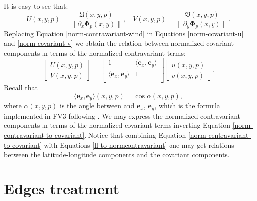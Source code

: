 It is easy to see that:
\begin{equation}
	{U}(x,y,p)  = \frac{\mathfrak{U}(x,y,p)}{\|\partial_x\boldsymbol{\Phi}_p(x,y)\|}, \quad
	{V}(x,y,p)  = \frac{\mathfrak{V}(x,y,p)}{\|\partial_y\boldsymbol{\Phi}_p(x,y)\|}.
\end{equation}
Replacing Equation \eqref{norm-contravariant-wind} in 
Equations \eqref{norm-covariant-u} and \eqref{norm-covariant-v} we obtain
the relation between normalized covariant components in terms of the
normalized contravariant terms:
\begin{equation}
	\label{norm-contravariant-to-covariant}
	\begin{bmatrix}
		{U}(x,y,p) \\
		{V}(x,y,p)
	\end{bmatrix}
	=
	\begin{bmatrix}
		1 
		& \langle 	\boldsymbol{e}_x, \boldsymbol{e}_y \rangle \\
		\langle 	\boldsymbol{e}_x, \boldsymbol{e}_y \rangle 
		& 1\\
	\end{bmatrix}
	\begin{bmatrix}
		{u} (x,y,p) \\
		{v} (x,y,p) 
	\end{bmatrix}.
\end{equation}
Recall that
\begin{equation}
\langle 	\boldsymbol{e}_x, \boldsymbol{e}_y \rangle(x,y,p) = \cos \alpha(x,y,p),
\end{equation}
where $\alpha(x,y,p)$ is the angle between and 	$\boldsymbol{e}_x$, $\boldsymbol{e}_y$, which
is the formula implemented in FV3 following \citet{putman:2007}.
We may express the normalized contravariant components in terms of 
the normalized covariant terms inverting Equation \eqref{norm-contravariant-to-covariant}.
Notice that combining Equation \eqref{norm-contravariant-to-covariant} with Equations
\eqref{ll-to-normcontravariant}
one may get relations between the latitude-longitude 
components and the covariant components.


\section{Edges treatment}
\label{cs-halodata}

